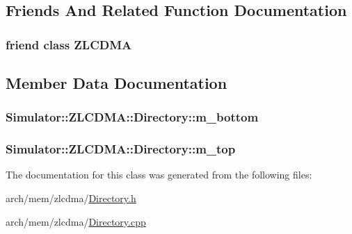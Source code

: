 \subsection{Friends And Related Function Documentation}
\hypertarget{class_simulator_1_1_z_l_c_d_m_a_1_1_directory_a1c09861c9a70825235b5f80518d478a1}{
\subsubsection[{Z\+L\+C\+D\+M\+A}]{\setlength{\rightskip}{0pt plus 5cm}friend class {\bf Z\+L\+C\+D\+M\+A}\hspace{0.3cm}{\ttfamily [friend]}}}\label{class_simulator_1_1_z_l_c_d_m_a_1_1_directory_a1c09861c9a70825235b5f80518d478a1}


\subsection{Member Data Documentation}
\hypertarget{class_simulator_1_1_z_l_c_d_m_a_1_1_directory_a8355d8daf89086f5d173bdd9e92d72da}{
\subsubsection[{m\+\_\+bottom}]{ Simulator\+::\+Z\+L\+C\+D\+M\+A\+::\+Directory\+::m\+\_\+bottom\hspace{0.3cm}{\ttfamily [protected]}}}\label{class_simulator_1_1_z_l_c_d_m_a_1_1_directory_a8355d8daf89086f5d173bdd9e92d72da}
\hypertarget{class_simulator_1_1_z_l_c_d_m_a_1_1_directory_a14a3b8cc4fa2a24f4eae6a02a48bfd1b}{
\subsubsection[{m\+\_\+top}]{ Simulator\+::\+Z\+L\+C\+D\+M\+A\+::\+Directory\+::m\+\_\+top\hspace{0.3cm}{\ttfamily [protected]}}}\label{class_simulator_1_1_z_l_c_d_m_a_1_1_directory_a14a3b8cc4fa2a24f4eae6a02a48bfd1b}


The documentation for this class was generated from the following files\+:\begin{DoxyCompactItemize}
\item 
arch/mem/zlcdma/\hyperlink{zlcdma_2_directory_8h}{Directory.\+h}\item 
arch/mem/zlcdma/\hyperlink{zlcdma_2_directory_8cpp}{Directory.\+cpp}\end{DoxyCompactItemize}
